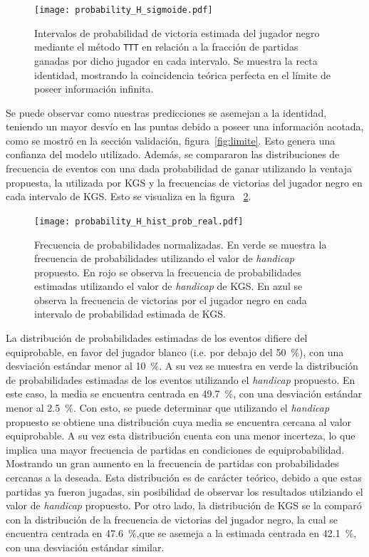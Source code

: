 \documentclass[11pt,twoside, spanish]{report} %
\begin{document}
\begin{figure}[H]
	\centering
	\texttt{[image: probability\_H\_sigmoide.pdf]}
	\caption{Intervalos de probabilidad de victoria estimada del jugador negro  mediante el m\'etodo \texttt{TTT} en relaci\'on a la fracci\'on de partidas ganadas por dicho jugador en cada intervalo. Se muestra la recta identidad, mostrando la coincidencia te\'orica perfecta en el l\'imite de poseer informaci\'on infinita.}
	\label{fig:estimations_H_sigmoide}
\end{figure}


Se puede observar como nuestras predicciones se asemejan a la identidad, teniendo un mayor desv\'io en las puntas  debido a poseer una informaci\'on acotada, como se mostr\'o en la secci\'on validaci\'on, figura~\ref{fig:limite}.
Esto genera una confianza del modelo utilizado.
Adem\'as, se compararon las distribuciones de frecuencia de eventos con una dada probabilidad de ganar utilizando la ventaja propuesta, la utilizada por KGS y  la frecuencias de victorias del jugador negro en cada intervalo de KGS.
Esto se visualiza en la figura ~\ref{fig:estimations_H_hist_prob_real}.


\begin{figure}[H]
	\centering
	\texttt{[image: probability\_H\_hist\_prob\_real.pdf]}
	\caption{Frecuencia de probabilidades normalizadas. En verde se muestra la frecuencia de probabilidades utilizando el valor de \textit{handicap} propuesto. En rojo se observa la frecuencia de probabilidades estimadas utilizando el valor de \textit{handicap} de KGS.  En azul se observa la frecuencia de victorias por el jugador negro en cada intervalo de probabilidad estimada de KGS.}
	\label{fig:estimations_H_hist_prob_real}
\end{figure}

La distribuci\'on de probabilidades estimadas de los eventos difiere del equiprobable, en favor del jugador blanco (i.e. por debajo del \SI{50}{\percent}), con una desviaci\'on est\'andar menor al \SI{10}{\percent}.
A su vez se muestra en verde la distribuci\'on de probabilidades estimadas de los eventos utilizando el \textit{handicap} propuesto.
En este caso, la media se encuentra centrada en \SI{49.7}{\percent}, con una desviaci\'on est\'andar menor al \SI{2.5}{\percent}.
Con esto, se puede determinar que utilizando el \textit{handicap} propuesto se obtiene una distribuci\'on cuya media se encuentra cercana al valor equiprobable.
A su vez esta distribuci\'on cuenta con una menor incerteza, lo que implica una mayor frecuencia de partidas en condiciones de equiprobabilidad.
Mostrando un gran aumento en la frecuencia de partidas con probabilidades cercanas a la deseada.
Esta distribuci\'on es de car\'acter te\'orico, debido a que estas partidas ya fueron jugadas, sin posibilidad de observar los resultados utilziando el valor de \textit{handicap} propuesto.
Por otro lado, la distribuci\'on de KGS se la compar\'o con la distribuci\'on de la frecuencia de victorias del jugador negro, la cual se encuentra centrada en \SI{47.6}{\percent},que se asemeja a la estimada centrada en  \SI{42.1}{\percent}, con una desviaci\'on est\'andar similar.
\end{document}
